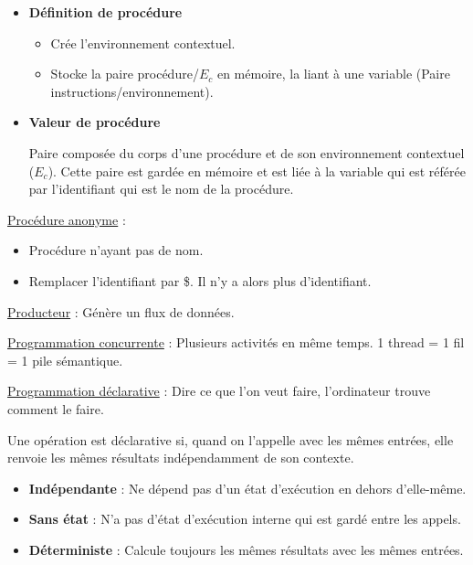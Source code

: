 \documentclass[fr,license=none,skiptoc]{../../../eplsummary}
\begin{document}
\begin{flushleft}
\begin{itemize}
\begin{itemize} [label=\textbullet, font=\MEDIUM]
\item Exécute le corps de procédure avec ce nouvel \textcolor{miorangerouge}{E}.
\end{itemize}



\item \textbf{Définition de procédure}
\begin{itemize} [label=\textbullet, font=\MEDIUM]
\item Crée l'environnement contextuel.
\item Stocke la paire procédure/\textcolor{miorangerouge}{$E_c$} en mémoire, la liant à une variable (Paire instructions/environnement).
\end{itemize}



\item \textbf{Valeur de procédure}

Paire composée du corps d'une procédure et de son environnement contextuel (\textcolor{miorangerouge}{$E_{c}$}). Cette paire est gardée en mémoire et est liée à la variable qui est référée par l'identifiant qui est le nom de la procédure.
\end{itemize}\bigbreak





\textcolor{mauvedef}{\underline{Procédure anonyme}} :
\begin{itemize}
\item Procédure n'ayant pas de nom.
\item Remplacer l'identifiant par \textcolor{miorangerouge}{\$}. Il n'y a alors plus d'identifiant.
\end{itemize}\bigbreak


\textcolor{mauvedef}{\underline{Producteur}} : Génère un flux de données.  \bigbreak

\textcolor{mauvedef}{\underline{Programmation concurrente}} : Plusieurs activités en même temps. 1 thread = 1 fil = 1 pile sémantique.  \bigbreak

\textcolor{mauvedef}{\underline{Programmation déclarative}} : Dire ce que l'on veut faire, l'ordinateur trouve comment le faire.  

Une opération est déclarative si, quand on l'appelle avec les mêmes entrées, elle renvoie les mêmes résultats indépendamment de son contexte.
\begin{itemize}
\item \textbf{Indépendante} : Ne dépend pas d'un état d'exécution en dehors d'elle-même.
\item \textbf{Sans état} : N'a pas d'état d'exécution interne qui est gardé entre les appels.
\item \textbf{Déterministe} : Calcule toujours les mêmes résultats avec les mêmes entrées.
\end{itemize}\bigbreak




\end{flushleft}
\end{document}
